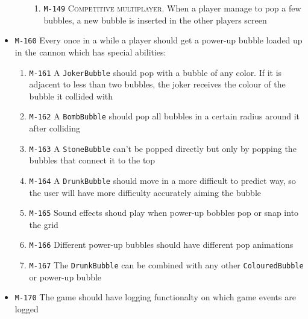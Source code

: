 \documentclass[a4paper]{article}
\begin{document}
\begin{itemize}
\begin{enumerate}
\begin{enumerate}
        \item \texttt{M-149} \textsc{Competitive multiplayer.} When a player manage to pop a few bubbles, a new bubble is inserted in the other players screen
      \end{enumerate}
  \end{enumerate}
  
  
  \item \texttt{M-160} Every once in a while a player should get a power-up bubble loaded up in the cannon which has special abilities:
  
        \begin{enumerate}
          \item \texttt{M-161} A \texttt{JokerBubble} should pop with a bubble of any color. If it is adjacent to less than two bubbles, the joker receives the colour of the bubble it collided with
          \item \texttt{M-162} A \texttt{BombBubble} should pop all bubbles in a certain radius around it after colliding
          \item \texttt{M-163} A \texttt{StoneBubble} can't be popped directly but only by popping the bubbles that connect it to the top
          \item \texttt{M-164} A \texttt{DrunkBubble} should move in a more difficult to predict way, so the user will have more difficulty accurately aiming the bubble
          \item \texttt{M-165} Sound effects shoud play when power-up bobbles pop or snap into the grid
          \item \texttt{M-166} Different power-up bubbles should have different pop animations
          \item \texttt{M-167} The \texttt{DrunkBubble} can be combined with any other \texttt{ColouredBubble} or power-up bubble
      \end{enumerate}
 
  
  
  
  \item \texttt{M-170} The game should have logging functionalty on which game events are logged
  

\end{itemize}
\end{document}

